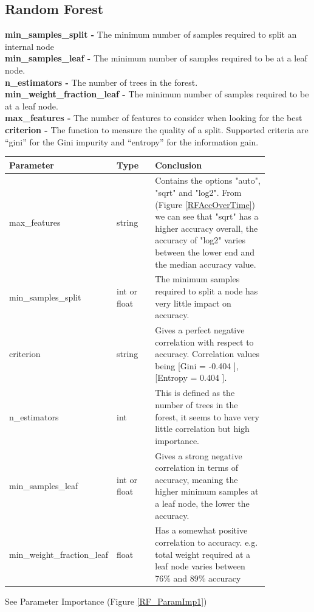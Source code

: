 \documentclass[11pt]{article}
\begin{document}
\newpage
\subsection{Random Forest}
\textbf{min\_samples\_split -} The minimum number of samples required to split an internal node \\
\textbf{min\_samples\_leaf -} The minimum number of samples required to be at a leaf node.  \\
\textbf{n\_estimators -} The number of trees in the forest.\\
\textbf{min\_weight\_fraction\_leaf -} The minimum number of samples required to be at a leaf node. \\
\textbf{max\_features -} The number of features to consider when looking for the best \\
\textbf{criterion -} The function to measure the quality of a split. Supported criteria are “gini” for the Gini impurity and “entropy” for the information gain. \\


\begin{table}[ht]
  \centering
  \begin{tabular}{|p{0.25\linewidth} | p{0.15 \linewidth} | p{0.45\linewidth}|} 
    \hline
    \textbf{Parameter}  & \textbf{Type} & \textbf{Conclusion} \\ \hline
    max\_features & string & Contains the options "auto", "sqrt" and "log2". From (Figure \ref{RFAccOverTime}) we can see that "sqrt" has a higher accuracy overall, the accuracy of "log2" varies between the lower end and the median accuracy value.\\ \hline
    min\_samples\_split & int or float & The minimum samples required to split a node has very little impact on accuracy.  \\ \hline
    criterion & string & Gives a perfect negative correlation with respect to accuracy. Correlation values being [Gini = -0.404 ], [Entropy = 0.404 ]. \\ \hline
    n\_estimators & int & This is defined as the number of trees in the forest, it seems to have very little correlation but high importance. \\ \hline
    min\_samples\_leaf & int or float & Gives a strong negative correlation in terms of accuracy, meaning the higher minimum samples at a leaf node, the lower the accuracy. \\ \hline
    min\_weight\_fraction\_leaf & float & Has a somewhat positive correlation to accuracy. e.g. total weight required at a leaf node varies between 76\% and 89\% accuracy\\ \hline
  \end{tabular}
\end{table}\label{RF_Analysis_Table}
See Parameter Importance (Figure \ref{RF_ParamImp1})
\end{document}
